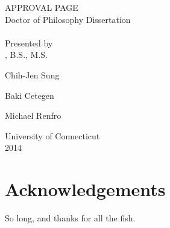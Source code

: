 \documentclass[12pt, letterpaper]{article}
\begin{document}
\setcounter{page}{1}
\begin{center}
APPROVAL PAGE \\
Doctor of Philosophy Dissertation \\
\thetitle \\
\blankline \blankline
Presented by \\
\theauthor, B.S., M.S. \\
\end{center}
\blankline
{}
\vspace{-0.5\baselineskip}
\begin{center}
Chih-Jen Sung
\end{center}
\blankline
{}
\vspace{-0.5\baselineskip}
\begin{center}
Baki Cetegen
\end{center}
\blankline
{}
\vspace{-0.5\baselineskip}
\begin{center}
Michael Renfro
\end{center}
\blankline \blankline \blankline \blankline \blankline
\begin{center}
University of Connecticut \\
2014
\end{center}
\newpage

{} 
\section*{Acknowledgements}
So long, and thanks for all the fish.
\newpage

\tableofcontents
\newpage
\listoffigures
\newpage
\listoftables
\newpage

\setcounter{page}{1}

% 

% 
\end{document}
